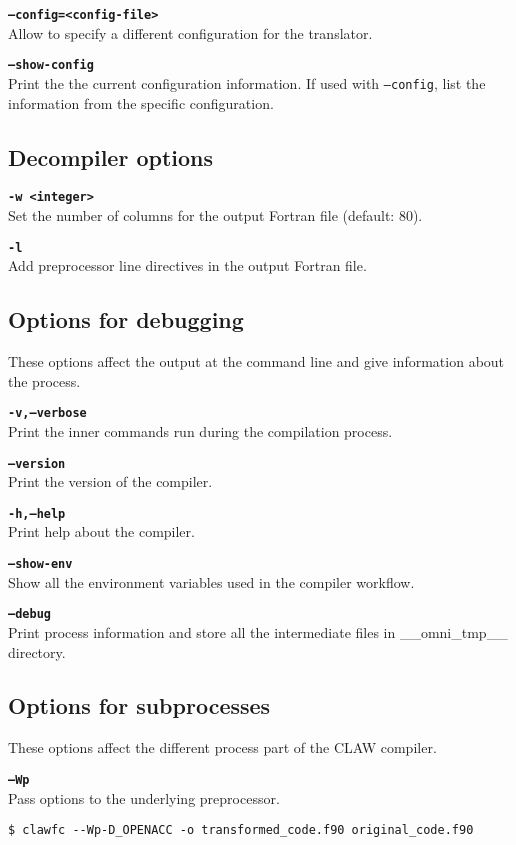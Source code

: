 \documentclass{article}
\begin{document}
\textbf{\texttt{--config=<config-file>}}\\
Allow to specify a different configuration for the translator.

\textbf{\texttt{--show-config}}\\
Print the the current configuration information. If used with \texttt{--config}, list the information from the specific configuration.

\subsection{Decompiler options}
\textbf{\texttt{-w <integer>}}\\
Set the number of columns for the output Fortran file (default: 80).

\textbf{\texttt{-l}}\\
Add preprocessor line directives in the output Fortran file.

\subsection{Options for debugging}
These options affect the output at the command line and give information about the process.

\textbf{\texttt{-v,--verbose}}\\
Print the inner commands run during the compilation process.

\textbf{\texttt{--version}}\\
Print the version of the compiler.

\textbf{\texttt{-h,--help}}\\
Print help about the compiler.

\textbf{\texttt{--show-env}}\\
Show all the environment variables used in the compiler workflow.

\textbf{\texttt{--debug}}\\
Print process information and store all the intermediate files in \_\_omni\_tmp\_\_ directory.

\subsection{Options for subprocesses}
These options affect the different process part of the CLAW compiler.

\textbf{\texttt{--Wp}}\\
Pass options to the underlying preprocessor.
\begin{lstlisting}
$ clawfc --Wp-D_OPENACC -o transformed_code.f90 original_code.f90
\end{lstlisting}
\end{document}
